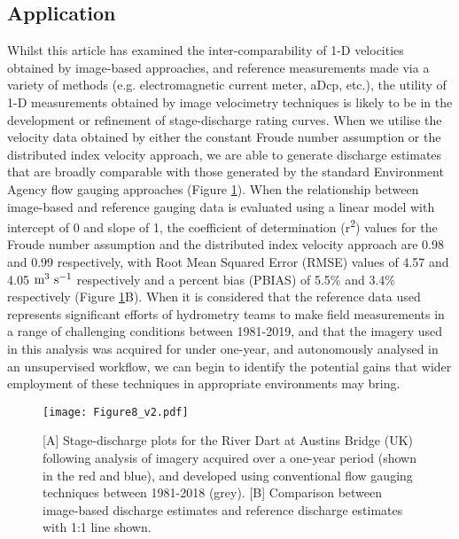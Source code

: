 \documentclass[hess, manuscript]{copernicus}
\begin{document}
\subsection{Application}
Whilst this article has examined the inter-comparability of 1-D velocities obtained by image-based approaches, and reference measurements made via a variety of methods (e.g. electromagnetic current meter, aDcp, etc.), the utility of 1-D measurements obtained by image velocimetry techniques is likely to be in the development or refinement of stage-discharge rating curves. When we utilise the velocity data obtained by either the constant Froude number assumption or the distributed index velocity approach, we are able to generate discharge estimates that are broadly comparable with those generated by the standard Environment Agency flow gauging approaches (Figure \ref{Figure8}). When the relationship between image-based and reference gauging data is evaluated using a linear model with intercept of 0 and slope of 1, the coefficient of determination (r\textsuperscript{2}) values for the Froude number assumption and the distributed index velocity approach are 0.98 and 0.99 respectively, with Root Mean Squared Error (RMSE) values of 4.57 and 4.05 $\textnormal{m\textsuperscript{3} s\textsuperscript{-1}}$ respectively and a percent bias (PBIAS) of 5.5\% and 3.4\% respectively (Figure \ref{Figure8}B). When it is considered that the reference data used represents significant efforts of hydrometry teams to make field measurements in a range of challenging conditions between 1981-2019, and that the imagery used in this analysis was acquired for under one-year, and autonomously analysed in an unsupervised workflow, we can begin to identify the potential gains that wider employment of these techniques in appropriate environments may bring.

\begin{figure}[!htb]
\centering 
\texttt{[image: Figure8\_v2.pdf]}
\caption{[A] Stage-discharge plots for the River Dart at Austins Bridge (UK) following analysis of imagery acquired over a one-year period (shown in the red and blue), and developed using conventional flow gauging techniques between 1981-2018 (grey). [B] Comparison between image-based discharge estimates and reference discharge estimates with 1:1 line shown.}
\label{Figure8} 
\end{figure}
\end{document}
